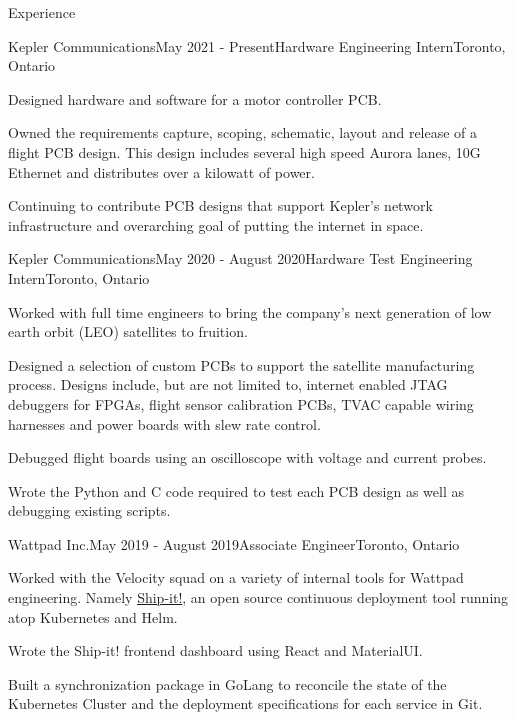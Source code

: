 \documentclass{resume} %
\begin{document}
\begin{rSection}{Experience}

\begin{rSubsection}{Kepler Communications}{May 2021 - Present}{Hardware
    Engineering Intern}{Toronto, Ontario}
    \item Designed hardware and software for a motor controller PCB.
    \item Owned the requirements capture, scoping, schematic, layout and release of a flight PCB design. This design includes several high speed Aurora lanes, 10G Ethernet and distributes over a kilowatt of power.
    \item Continuing to contribute PCB designs that support Kepler's network infrastructure and overarching goal of putting the internet in space.
\end{rSubsection}

\begin{rSubsection}{Kepler Communications}{May 2020 - August 2020}{Hardware
    Test Engineering Intern}{Toronto, Ontario}
\item Worked with full time engineers to bring the company's next generation of
  low earth orbit (LEO) satellites to fruition.
\item Designed a selection of custom PCBs to support the satellite manufacturing
  process. Designs include, but are not limited to, internet enabled JTAG
  debuggers for FPGAs, flight sensor calibration PCBs, TVAC capable wiring
  harnesses and power boards with slew rate control.
\item Debugged flight boards using an oscilloscope with voltage
  and current probes.
\item Wrote the Python and C code required to test each PCB design as well as
  debugging existing scripts.
\end{rSubsection}


\begin{rSubsection}{Wattpad Inc.}{May 2019 - August 2019}{Associate
    Engineer}{Toronto, Ontario}
\item Worked with the Velocity squad on a variety of internal tools for Wattpad engineering.
  Namely \href{https://github.com/Wattpad/ship-it}{Ship-it!}, an open source continuous deployment tool running atop Kubernetes and
  Helm.
\item Wrote the Ship-it! frontend dashboard using React and MaterialUI.
\item Built a synchronization package in GoLang to reconcile the state of the
  Kubernetes Cluster and the deployment specifications for each service in Git.
\end{rSubsection}


\end{rSection}
\end{document}
